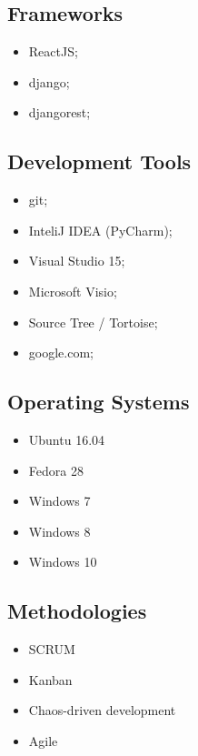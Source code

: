 \documentclass[12pt,a4paper,sans]{moderncv} %
\begin{document}
\subsection{Frameworks}
\begin{multicols}{3}
\begin{itemize}
\item ReactJS; \item django; \item djangorest;
\end{itemize}
\end{multicols}
\subsection{Development Tools}
\begin{multicols}{3}
\begin{itemize}
\item git; \item InteliJ IDEA (PyCharm); \item Visual Studio 15;
\item Microsoft Visio; \item Source Tree / Tortoise; \item google.com;
\end{itemize}
\end{multicols}
\subsection{Operating Systems}
\begin{multicols}{3}
\begin{itemize}
\item Ubuntu 16.04 \item Fedora 28 \item Windows 7 
\item Windows 8 \item Windows 10 
\end{itemize}
\end{multicols}
\subsection{Methodologies}
\begin{multicols}{3}
\begin{itemize}
\item SCRUM \item Kanban \item Chaos-driven development
\item Agile
\end{itemize}
\end{multicols}
\end{document}
